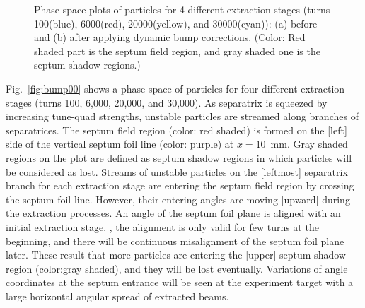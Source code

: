 \documentclass[aps,prstab,onecolumn,preprint,endfloats,11pt]{revtex4-1}
\begin{document}
\begin{figure}[!tbp]
  \caption{\label{fig:bump0}Phase space plots of particles for 4 different extraction stages (turns 100(blue), 6000(red), 20000(yellow), and 30000(cyan)): (a) before and (b) after applying dynamic bump corrections. (Color: Red shaded part is the septum field region, and gray shaded one is the septum shadow regions.)}
\end{figure}

Fig.~\ref{fig:bump00} shows a phase space of particles for four different extraction stages (turns 100, 6,000, 20,000, and 30,000).
As separatrix is squeezed by increasing tune-quad strengths, unstable particles are streamed along branches of separatrices. 
The septum field region (color: red shaded) is formed on the [left] side of the vertical septum foil line (color: purple) at $x=10$~mm. 
Gray shaded regions on the plot are defined as septum shadow regions in which particles will be considered as lost.
Streams of unstable particles on the [leftmost] separatrix branch for each extraction stage are entering the septum field region by crossing the septum foil line.
However, their entering angles are moving [upward] during the extraction processes.
An angle of the septum foil plane is aligned with an initial extraction stage.
, the alignment is only valid for few turns at the beginning, and there will be continuous misalignment of the septum foil plane later.
These result that more particles are entering the [upper] septum shadow region (color:gray shaded), and they will be lost eventually.
Variations of angle coordinates at the septum entrance will be seen at the experiment target with a large horizontal angular spread of extracted beams.
\end{document}
